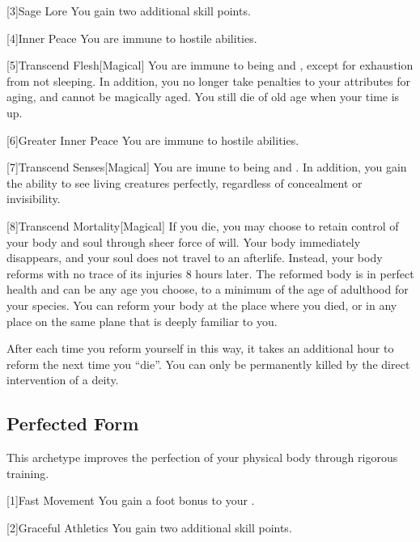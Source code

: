         [3]{Sage Lore} You gain two additional skill points.

        [4]{Inner Peace} You are immune to hostile  abilities.

        [5]{Transcend Flesh}[Magical]
        You are immune to being  and , except for exhaustion from not sleeping.
        In addition, you no longer take penalties to your attributes for aging, and cannot be magically aged.
        You still die of old age when your time is up.

        [6]{Greater Inner Peace}
        You are immune to hostile  abilities.

        [7]{Transcend Senses}[Magical]
        You are imune to being  and .
        In addition, you gain the ability to see living creatures perfectly, regardless of concealment or invisibility.

        [8]{Transcend Mortality}[Magical]
        If you die, you may choose to retain control of your body and soul through sheer force of will.
        Your body immediately disappears, and your soul does not travel to an afterlife.
        Instead, your body reforms with no trace of its injuries 8 hours later.
        The reformed body is in perfect health and can be any age you choose, to a minimum of the age of adulthood for your species.
        You can reform your body at the place where you died, or in any place on the same plane that is deeply familiar to you.

        After each time you reform yourself in this way, it takes an additional hour to reform the next time you ``die''.
        You can only be permanently killed by the direct intervention of a deity.

    \subsection{Perfected Form}
        This archetype improves the perfection of your physical body through rigorous training.

        [1]{Fast Movement} You gain a  foot bonus to your .

        [2]{Graceful Athletics} You gain two additional skill points.

